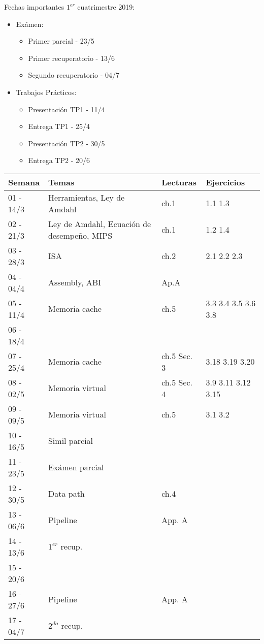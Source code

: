 \documentclass[9pt,a4paper]{article}
\begin{document}
Fechas importantes $1^{er}$ cuatrimestre 2019:

\begin{itemize}
\item Exámen:
\begin{itemize}
\item Primer parcial - 23/5
\item Primer recuperatorio - 13/6
\item Segundo recuperatorio - 04/7
\end{itemize}
\item Trabajos Prácticos:
\begin{itemize}
\item Presentación TP1 - 11/4
\item Entrega TP1 - 25/4
\item Presentación TP2 - 30/5
\item Entrega TP2 - 20/6
\end{itemize}

\end{itemize}

\begin{tabular}{ |l | l | l | l |}
\hline
Semana & Temas			& Lecturas     & Ejercicios						\\
\hline
01 - 14/3	& Herramientas, Ley de Amdahl 		& ch.1 \cite{caaqa}	&	1.1 1.3		\\
\hline
02 - 21/3	& Ley de Amdahl, Ecuación de desempeño, MIPS & ch.1 \cite{caaqa}    & 1.2 1.4	\\
\hline
03 - 28/3	& ISA					&		ch.2 \cite{caaqa}	&	2.1 2.2 2.3				\\
\hline
04 - 04/4	& Assembly, ABI 	& 		Ap.A \cite{caaqa} \cite{abi} &	\\
\hline
05 - 11/4	& Memoria cache	& 	ch.5 \cite{caaqa}	&	3.3 3.4 3.5 3.6 3.8
\\
\hline
\rowcolor{lightgray} 06 - 18/4	& 	& 		&		\\
\hline
07 - 25/4	& Memoria cache	& 		ch.5 \cite{caaqa} Sec. 3 \cite{wepskam}&	 3.18 3.19 3.20
\\
\hline
08 - 02/5	& Memoria virtual	&	ch.5 \cite{caaqa} Sec. 4 \cite{wepskam}&	 3.9 3.11 3.12 3.15\\
\hline
09 - 09/5	& Memoria virtual	& 	ch.5 \cite{caaqa} \cite{vmp1} \cite{vmp2} &	3.1 3.2 \\
\hline
10 - 16/5	& Simil parcial	&		&							\\
\hline
\rowcolor{green} 11 - 23/5	& Exámen parcial	& 	&								\\
\hline
12 - 30/5	& Data path			& 	ch.4 \cite{coadhsi} & \\
\hline
13 - 06/6 & Pipeline			& App. A \cite{caaqa}	&	\\
\hline
\rowcolor{green} 14 - 13/6 & $1^{er}$ recup.	&		&							\\
\hline
\rowcolor{lightgray} 15 - 20/6	& 			&	&								\\
\hline
16 - 27/6 & Pipeline 	&	App. A \cite{caaqa}			& \\
\hline
\rowcolor{green} 17 - 04/7 & $2^{do}$ recup.			&		& \\
\hline

\end{tabular}
\end{document}
